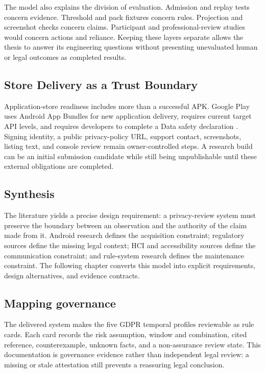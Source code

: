The model also explains the division of evaluation. Admission and replay tests concern evidence. Threshold and pack fixtures concern rules. Projection and screenshot checks concern claims. Participant and professional-review studies would concern actions and reliance. Keeping these layers separate allows the thesis to answer its engineering questions without presenting unevaluated human or legal outcomes as completed results.

\subsection{Store Delivery as a Trust Boundary}

Application-store readiness includes more than a successful APK. Google Play uses Android App Bundles for new application delivery, requires current target API levels, and requires developers to complete a Data safety declaration \cite{androidbundle2026,playtarget2026,playdatasafety2026}. Signing identity, a public privacy-policy URL, support contact, screenshots, listing text, and console review remain owner-controlled steps. A research build can be an initial submission candidate while still being unpublishable until these external obligations are completed.

\subsection{Synthesis}

The literature yields a precise design requirement: a privacy-review system must preserve the boundary between an observation and the authority of the claim made from it. Android research defines the acquisition constraint; regulatory sources define the missing legal context; HCI and accessibility sources define the communication constraint; and rule-system research defines the maintenance constraint. The following chapter converts this model into explicit requirements, design alternatives, and evidence contracts.

\subsection{Mapping governance}

The delivered system makes the five GDPR temporal profiles reviewable as rule cards. Each card records the risk assumption, window and combination, cited reference, counterexample, unknown facts, and a non-assurance review state. This documentation is governance evidence rather than independent legal review: a missing or stale attestation still prevents a reassuring legal conclusion.
